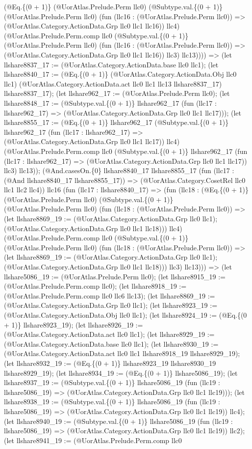 \documentclass[11pt]{article}
\begin{document}
(@Eq.\{(0 + 1)\} (@UorAtlas.Prelude.Perm llc0) (@Subtype.val.\{(0 + 1)\} (@UorAtlas.Prelude.Perm llc0) (fun (llc16 : (@UorAtlas.Prelude.Perm llc0)) => (@UorAtlas.Category.ActionData.Grp llc0 llc1 llc16)) llc4) (@UorAtlas.Prelude.Perm.comp llc0 (@Subtype.val.\{(0 + 1)\} (@UorAtlas.Prelude.Perm llc0) (fun (llc16 : (@UorAtlas.Prelude.Perm llc0)) => (@UorAtlas.Category.ActionData.Grp llc0 llc1 llc16)) llc3) llc13)))) => (let llshare8837\_17 := (@UorAtlas.Category.ActionData.base llc0 llc1); (let llshare8840\_17 := (@Eq.\{(0 + 1)\} (@UorAtlas.Category.ActionData.Obj llc0 llc1) (@UorAtlas.Category.ActionData.act llc0 llc1 llc13 llshare8837\_17) llshare8837\_17); (let llshare962\_17 := (@UorAtlas.Prelude.Perm llc0); (let llshare8848\_17 := (@Subtype.val.\{(0 + 1)\} llshare962\_17 (fun (llc17 : llshare962\_17) => (@UorAtlas.Category.ActionData.Grp llc0 llc1 llc17))); (let llshare8855\_17 := (@Eq.\{(0 + 1)\} llshare962\_17 (@Subtype.val.\{(0 + 1)\} llshare962\_17 (fun (llc17 : llshare962\_17) => (@UorAtlas.Category.ActionData.Grp llc0 llc1 llc17)) llc4) (@UorAtlas.Prelude.Perm.comp llc0 (@Subtype.val.\{(0 + 1)\} llshare962\_17 (fun (llc17 : llshare962\_17) => (@UorAtlas.Category.ActionData.Grp llc0 llc1 llc17)) llc3) llc13)); (@And.casesOn.\{0\} llshare8840\_17 llshare8855\_17 (fun (llc17 : (@And llshare8840\_17 llshare8855\_17)) => (@UorAtlas.Category.CosetRel llc0 llc1 llc2 llc4)) llc16 (fun (llc17 : llshare8840\_17) => (fun (llc18 : (@Eq.\{(0 + 1)\} (@UorAtlas.Prelude.Perm llc0) (@Subtype.val.\{(0 + 1)\} (@UorAtlas.Prelude.Perm llc0) (fun (llc18 : (@UorAtlas.Prelude.Perm llc0)) => (let llshare8869\_19 := (@UorAtlas.Category.ActionData.Grp llc0 llc1); (@UorAtlas.Category.ActionData.Grp llc0 llc1 llc18))) llc4) (@UorAtlas.Prelude.Perm.comp llc0 (@Subtype.val.\{(0 + 1)\} (@UorAtlas.Prelude.Perm llc0) (fun (llc18 : (@UorAtlas.Prelude.Perm llc0)) => (let llshare8869\_19 := (@UorAtlas.Category.ActionData.Grp llc0 llc1); (@UorAtlas.Category.ActionData.Grp llc0 llc1 llc18))) llc3) llc13))) => (let llshare5086\_19 := (@UorAtlas.Prelude.Perm llc0); (let llshare8915\_19 := (@UorAtlas.Prelude.Perm.comp llc0); (let llshare8918\_19 := (@UorAtlas.Prelude.Perm.comp llc0 llc6 llc13); (let llshare8869\_19 := (@UorAtlas.Category.ActionData.Grp llc0 llc1); (let llshare8923\_19 := (@UorAtlas.Category.ActionData.Obj llc0 llc1); (let llshare8924\_19 := (@Eq.\{(0 + 1)\} llshare8923\_19); (let llshare8926\_19 := (@UorAtlas.Category.ActionData.act llc0 llc1); (let llshare8929\_19 := (@UorAtlas.Category.ActionData.base llc0 llc1); (let llshare8930\_19 := (@UorAtlas.Category.ActionData.act llc0 llc1 llshare8918\_19 llshare8929\_19); (let llshare8932\_19 := (@Eq.\{(0 + 1)\} llshare8923\_19 llshare8930\_19 llshare8929\_19); (let llshare8934\_19 := (@Eq.\{(0 + 1)\} llshare5086\_19); (let llshare8937\_19 := (@Subtype.val.\{(0 + 1)\} llshare5086\_19 (fun (llc19 : llshare5086\_19) => (@UorAtlas.Category.ActionData.Grp llc0 llc1 llc19))); (let llshare8938\_19 := (@Subtype.val.\{(0 + 1)\} llshare5086\_19 (fun (llc19 : llshare5086\_19) => (@UorAtlas.Category.ActionData.Grp llc0 llc1 llc19)) llc4); (let llshare8940\_19 := (@Subtype.val.\{(0 + 1)\} llshare5086\_19 (fun (llc19 : llshare5086\_19) => (@UorAtlas.Category.ActionData.Grp llc0 llc1 llc19)) llc2); (let llshare8941\_19 := (@UorAtlas.Prelude.Perm.comp llc0 
\end{document}
